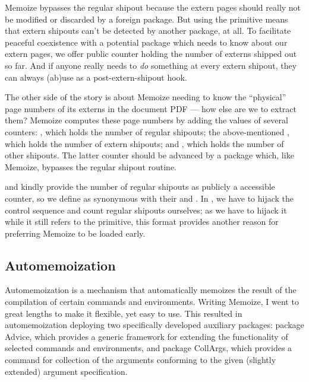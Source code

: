 \documentclass[a4paper,11pt]{article}
\begin{document}
Memoize bypasses the regular shipout because the extern pages should really not
be modified or discarded by a foreign package.  But using the primitive
 means that extern shipouts can't be detected by another
package, at all.  To facilitate peaceful coexistence with a potential package
which needs to know about our extern pages, we offer public counter
 holding the number of externs shipped out so far.  And
if anyone really needs to \emph{do} something at every extern shipout, they can
always (ab)use  as a
post-extern-shipout hook.

The other side of the story is about Memoize needing to know the ``physical''
page numbers of its externs in the document PDF --- how else are we to extract
them?  Memoize computes these page numbers by adding the values of several
counters: , which holds the number of regular shipouts;
the above-mentioned , which holds the number of extern
shipouts; and , which holds the number of other shipouts.
The latter counter should be advanced by a package which, like Memoize,
bypasses the regular shipout routine.

 and  kindly provide the number of regular
shipouts as publicly a accessible counter, so we define
 as synonymous with their
 and .  In , we
have to hijack the  control sequence and count regular shipouts
ourselves; as we have to hijack it while it still refers to the
 primitive, this format provides another reason for preferring
Memoize to be loaded early.


\subsection{Automemoization}
\label{sec:tut:automemoization-details}

Automemoization is a mechanism that automatically memoizes the result of the
compilation of certain commands and environments.  Writing Memoize, I went to
great lengths to make it flexible, yet easy to use.  This resulted in
automemoization deploying two specifically developed auxiliary packages:
package Advice, which provides a generic framework for extending the
functionality of selected commands and environments, and package CollArgs,
which provides a command for collection of the arguments conforming to the
given (slightly extended)  argument specification.
\end{document}
